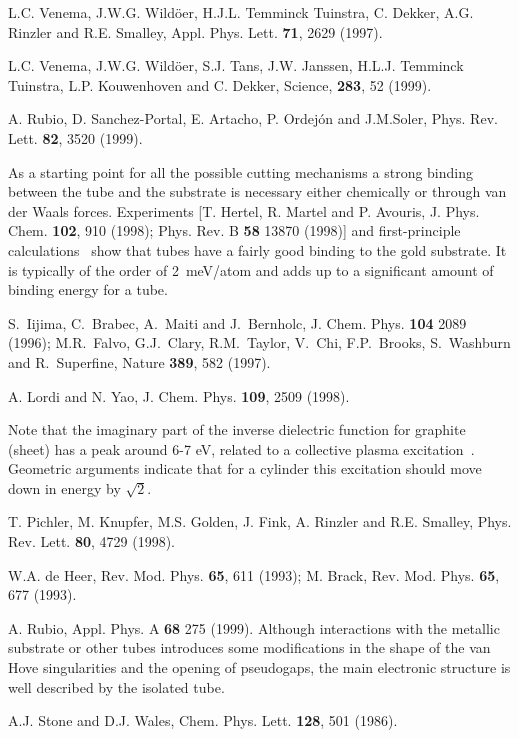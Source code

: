 \begin{multicols}{2}
\begin{thebibliography}{99}
 L.C. Venema, J.W.G. Wild\"{o}er, H.J.L. Temminck Tuinstra,
C. Dekker, A.G. Rinzler and R.E. Smalley, Appl. Phys. Lett. {\bf 71}, 2629
(1997).

 L.C. Venema, J.W.G. Wild\"{o}er, S.J. Tans, J.W. Janssen,
H.L.J. Temminck Tuinstra, L.P. Kouwenhoven and C. Dekker, Science, {\bf 283}, 52 (1999).

 A. Rubio, D. Sanchez-Portal, E. Artacho, P. Ordej\'{o}n and
J.M.Soler, Phys. Rev. Lett. {\bf 82}, 3520 (1999).

 As a starting point for all the possible
cutting mechanisms a strong binding between the tube and the
substrate is necessary either chemically or through van der Waals
forces. Experiments [T. Hertel, R. Martel and P. Avouris, J. Phys.
Chem. {\bf 102}, 910 (1998); Phys. Rev. B {\bf 58} 13870 (1998)]
and first-principle calculations~\cite{Rubio} show that tubes have
a fairly good binding to the gold substrate. It is typically of
the order of 2~meV/atom and adds up to a significant amount of
binding energy for a tube.

S.~Iijima, C.~Brabec, A.~Maiti and J.~Bernholc, J. Chem. Phys.
{\bf 104} 2089 (1996); M.R.~Falvo, G.J.~Clary, R.M.~Taylor,
V.~Chi, F.P.~Brooks, S.~Washburn and R.~Superfine, Nature {\bf
389}, 582 (1997).

 A. Lordi and N. Yao, J. Chem. Phys. {\bf 109}, 2509
(1998).

 Note that the
imaginary part of the inverse dielectric function for graphite
(sheet) has a peak around 6-7 eV, related to a collective plasma
excitation~\cite{book1}. Geometric arguments indicate that for a
cylinder this excitation should move down in energy by $\sqrt{2}$.

 T. Pichler, M. Knupfer, M.S. Golden, J. Fink, A. Rinzler
and R.E. Smalley, Phys. Rev. Lett. {\bf 80}, 4729 (1998).

 W.A. de Heer, Rev. Mod. Phys. {\bf 65}, 611 (1993);
M. Brack, Rev. Mod. Phys. {\bf 65}, 677 (1993).

 A. Rubio, Appl. Phys. A {\bf 68} 275 (1999).
Although interactions
with the metallic substrate or other tubes introduces some modifications
in the shape of the van Hove singularities and the opening of
pseudogaps, the main
electronic structure is well described by the isolated tube.

 A.J. Stone and D.J. Wales, Chem. Phys. Lett. {\bf 128},
501 (1986).


\end{thebibliography}
\end{multicols}
